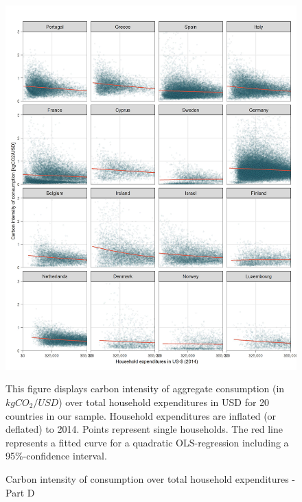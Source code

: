 \documentclass[12pt, a4paper]{article}
\newenvironment{subcaption}
{\strut
\vspace{-5pt}
\begin{minipage}[b]{0.9\textwidth}
  \hspace*{-\parindent}
  \footnotesize}
 {\end{minipage}}
\begin{document}
\begin{figure}[ht!]
  \centering
  \caption{Carbon intensity of consumption over total household expenditures - Part D} \label{fig:C4}
  \includegraphics{Analysis_Carbon_Intensity_Curve/All_Panel_D}
  \begin{subcaption}
    This figure displays carbon intensity of aggregate consumption (in $kgCO_{2}/USD$) over total household expenditures in USD for 20 countries in our sample. Household expenditures are inflated (or deflated) to 2014. Points represent single households. The red line represents a fitted curve for a quadratic OLS-regression including a 95\%-confidence interval.
  \end{subcaption}

\end{figure}

\clearpage
\end{document}
